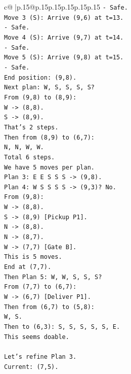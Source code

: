 \documentclass{article}
\begin{document}
{\begin{supertabular}{c@{$\;$}|p{.15\linewidth}@{}p{.15\linewidth}p{.15\linewidth}p{.15\linewidth}p{.15\linewidth}p{.15\linewidth}}
{{{\texttt{{-} Safe.} \\
\texttt{Move 3 (S): Arrive (9,6) at t=13.} \\
\texttt{{-} Safe.} \\
\texttt{Move 4 (S): Arrive (9,7) at t=14.} \\
\texttt{{-} Safe.} \\
\texttt{Move 5 (S): Arrive (9,8) at t=15.} \\
\texttt{{-} Safe.} \\
\texttt{End position: (9,8).} \\
\texttt{Next plan: W, S, S, S, S?} \\
\texttt{From (9,8) to (8,9):} \\
\texttt{W {-}> (8,8).} \\
\texttt{S {-}> (8,9).} \\
\texttt{That's 2 steps.} \\
\texttt{Then from (8,9) to (6,7):} \\
\texttt{N, N, W, W.} \\
\texttt{Total 6 steps.} \\
\texttt{We have 5 moves per plan.} \\
\texttt{Plan 3: E E S S S {-}> (9,8).} \\
\texttt{Plan 4: W S S S S {-}> (9,3)? No.} \\
\texttt{From (9,8):} \\
\texttt{W {-}> (8,8).} \\
\texttt{S {-}> (8,9) {[}Pickup P1{]}.} \\
\texttt{N {-}> (8,8).} \\
\texttt{N {-}> (8,7).} \\
\texttt{W {-}> (7,7) {[}Gate B{]}.} \\
\texttt{This is 5 moves.} \\
\texttt{End at (7,7).} \\
\texttt{Then Plan 5: W, W, S, S, S?} \\
\texttt{From (7,7) to (6,7):} \\
\texttt{W {-}> (6,7) {[}Deliver P1{]}.} \\
\texttt{Then from (6,7) to (5,8):} \\
\texttt{W, S.} \\
\texttt{Then to (6,3): S, S, S, S, S, E.} \\
\texttt{This seems doable.} \\
\\ 
\texttt{Let's refine Plan 3.} \\
\texttt{Current: (7,5).} \\
}}}
\end{supertabular}}
\end{document}
